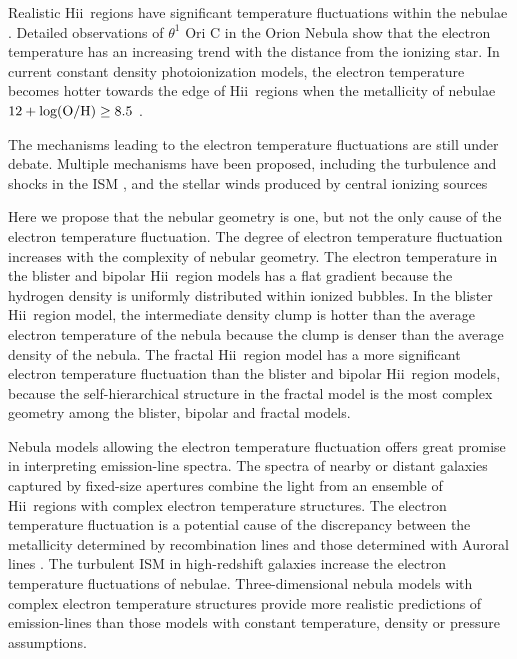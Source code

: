 \documentclass[twocolumn]{aastex62}
\newcommand{\hiireg}{{H{\sc ii}}}
\begin{document}
\begin{CJK*}{UTF8}{gbsn}
Realistic \hiireg\ regions have significant temperature fluctuations within the nebulae \citep{Rubin-2011,Peimbert-2019}.
Detailed observations of $\theta^{1}$ Ori C in the Orion Nebula show that the electron temperature has an increasing trend with the distance from the ionizing star.
In current constant density photoionization models, the electron temperature becomes hotter towards the edge of \hiireg\ regions when the metallicity of nebulae $\rm 12+log(O/H)\ge8.5$ \citep{Kewley-2019}.

The mechanisms leading to the electron temperature fluctuations are still under debate.
Multiple mechanisms have been proposed, including the turbulence and shocks in the ISM \citep{Peimbert-1991,O'Dell-2015}, and the stellar winds produced by central ionizing sources \citep{Gonzalez-Delgado-1994}

Here we propose that the nebular geometry is one, but not the only cause of the electron temperature fluctuation.
The degree of electron temperature fluctuation increases with the complexity of nebular geometry.
The electron temperature in the blister and bipolar \hiireg\ region models has a flat gradient because the hydrogen density is uniformly distributed within ionized bubbles. 
In the blister \hiireg\ region model, the intermediate density clump is hotter than the average electron temperature of the nebula because the clump is denser than the average density of the nebula.
The fractal \hiireg\ region model has a more significant electron temperature fluctuation than the blister and bipolar \hiireg\ region models, because the self-hierarchical structure in the fractal model is the most complex geometry among the blister, bipolar and fractal models. 

Nebula models allowing the electron temperature fluctuation offers great promise in interpreting emission-line spectra.
The spectra of nearby or distant galaxies captured by fixed-size apertures combine the light from an ensemble of \hiireg\ regions with complex electron temperature structures.
The electron temperature fluctuation is a potential cause of the discrepancy between the metallicity determined by recombination lines and those determined with Auroral lines \citep{Peimbert-2019}. 
The turbulent ISM in high-redshift galaxies increase the electron temperature fluctuations of nebulae.
Three-dimensional nebula models with complex electron temperature structures provide more realistic predictions of emission-lines than those models with constant temperature, density or pressure assumptions.



\end{CJK*}
\end{document}
